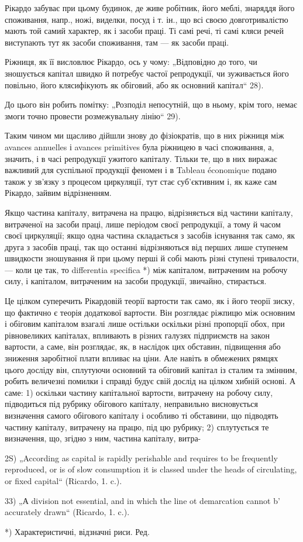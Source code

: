 Рікардо забуває при цьому будинок, де живе робітник, його меблі,
знаряддя його споживання, напр., ножі, виделки, посуд і т. ін., що всі
своєю довготривалістю мають той самий характер, як і засоби праці. Ті
самі речі, ті самі кляси речей виступають тут як засоби споживання,
там — як засоби праці.

Ріжниця, як її висловлює Рікардо, ось у чому: „Відповідно до того,
чи зношується капітал швидко й потребує частої репродукції, чи зуживається
його повільно, його клясифікують як обіговий, або як основний
капітал“ 28).

До цього він робить помітку: „Розподіл непосутній, що в ньому, крім
того, немає змоги точно провести розмежувальну лінію“ 29).

Таким чином ми щасливо дійшли знову до фізіократів, що в них
ріжниця між avances annuelles і avances primitives була ріжницею в часі
споживання, а, значить, і в часі репродукції ужитого капіталу. Тільки те,
що в них виражає важливий для суспільної продукції феномен і в Tableau
économique подано також у зв’язку з процесом циркуляції, тут стає
суб’єктивним і, як каже сам Рікардо, зайвим відрізненням.

Якщо частина капіталу, витрачена на працю, відрізняється від частини
капіталу, витраченої на засоби праці, лише періодом своєї репродукції,
а тому й часом своєї циркуляції; якщо одна частина складається з засобів
існування так само, як друга з засобів праці, так що останні відрізняються
від перших лише ступенем швидкости зношування й при цьому
перші й собі мають різні ступені тривалости, — коли це так, то differentia
specifica *) між капіталом, витраченим на робочу силу, і капіталом, витраченим
на засоби продукції, звичайно, стирається.

Це цілком суперечить Рікардовій теорії вартости так само, як і його
теорії зиску, що фактично є теорія додаткової вартости. Він розглядає
ріжпицю між основним і обіговим капіталом взагалі лише остільки
оскільки різні пропорції обох, при рівновеликих капіталах, впливають
в різних галузях підприємств на закон вартости, а саме, він розглядає,
як, в наслідок цих обставин, підвищення або зниження заробітної плати
впливає на ціни. Але навіть в обмежених рямцях цього досліду він, сплутуючи
основний та обіговий капітал із сталим та змінним, робить величезні
помилки і справді будує свій дослід на цілком хибній основі. А
саме: 1) оскільки частину капітальної вартости, витрачену на робочу
силу, підводиться під рубрику обігового капіталу, неправильно висновується
визначення самого обігового капіталу і особливо ті обставини,
що підводять частину капіталу, витрачену на працю, під цю рубрику;
2) сплутується те визначення, що, згідно з ним, частина капіталу, витра-

2S) „According as capital is rapidly perishable and requires to be frequently
reproduced, or is of slow consumption it is classed under the heads of circulating,
or fixed capital“ (Ricardo, 1. c.).

33) „А division not essential, and in which the line ot demarcation cannot b'
accurately drawn“ (Ricardo, 1. c.).

*) Характеристичні, відзначні риси. Ред.
